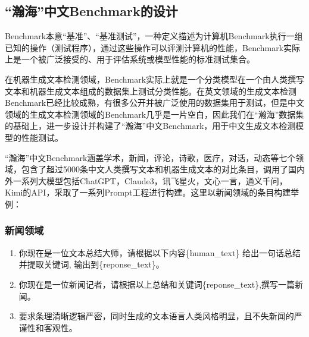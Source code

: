 \documentclass[a4paper]{report}
\begin{document}
\subsection{“瀚海”中文Benchmark的设计}
\begin{tcolorbox}[colback=gray!10!white, colframe=gray!50!black, title=Benchmark定义]
	Benchmark本意“基准”、“基准测试”，一种定义描述为计算机Benchmark执行一组已知的操作（测试程序），通过这些操作可以评测计算机的性能，Benchmark实际上是一个被广泛接受的、用于评估系统或模型性能的标准测试集合。
\end{tcolorbox}
在机器生成文本检测领域，Benchmark实际上就是一个分类模型在一个由人类撰写文本和机器生成文本组成的数据集上测试分类性能。在英文领域的生成文本检测Benchmark已经比较成熟，有很多公开并被广泛使用的数据集用于测试，但是中文领域的生成文本检测领域的Benchmark几乎是一片空白，因此我们在“瀚海”数据集的基础上，进一步设计并构建了“瀚海”中文Benchmark，用于中文生成文本检测模型的性能测试。

“瀚海”中文Benchmark涵盖学术，新闻，评论，诗歌，医疗，对话，动态等七个领域，包含了超过5000条中文人类撰写文本和机器生成文本的对比条目，调用了国内外一系列大模型包括ChatGPT，Claude3，讯飞星火，文心一言，通义千问，Kimi的API，采取了一系列Prompt工程进行构建。这里以新闻领域的条目构建举例：
\subsubsection{新闻领域}
\begin{enumerate}
	\item 你现在是一位文本总结大师，请根据以下内容\{human\_text\} 给出一句话总结并提取关键词, 输出到\{reponse\_text\}。
	\item 你现在是一位新闻记者，请根据以上总结和关键词\{reponse\_text\},撰写一篇新闻。
	\item 要求条理清晰逻辑严密，同时生成的文本语言人类风格明显，且不失新闻的严谨性和客观性。
\end{enumerate}
\end{document}
